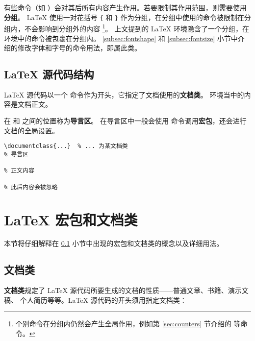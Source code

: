 有些命令（如 ）会对其后所有内容产生作用。若要限制其作用范围，则需要使用\textbf{分组}。
\LaTeX{} 使用一对花括号 \verb|{| 和 \verb|}| 作为分组，在分组中使用的命令被限制在分组内，不会影响到分组外的内容%
\footnote{个别命令在分组内仍然会产生全局作用，例如第 \ref{sec:counters} 节介绍的  等命令。}。
上文提到的 \LaTeX{} 环境隐含了一个分组，在环境中的命令被包裹在分组内。
\ref{subsec:fontshape} 和 \ref{subsec:fontsize} 小节中介绍的修改字体和字号的命令用法，即属此类。

\subsection{\LaTeX{} 源代码结构}\label{subsec:struct}

\LaTeX{} 源代码以一个  命令作为开头，它指定了文档使用的\textbf{文档类}。
 环境当中的内容是文档正文。

在  和  之间的位置称为\textbf{导言区}。
在导言区中一般会使用  命令调用\textbf{宏包}，还会进行文档的全局设置。
\begin{verbatim}
\documentclass{...}  % ... 为某文档类
% 导言区

% 正文内容

% 此后内容会被忽略
\end{verbatim}

\section{\LaTeX{} 宏包和文档类}\label{sec:latex-pkgs}

本节将仔细解释在 \ref{subsec:struct} 小节中出现的宏包和文档类的概念以及详细用法。

\subsection{文档类}\label{subsec:classes}

\textbf{文档类}规定了 \LaTeX{} 源代码所要生成的文档的性质——普通文章、书籍、演示文稿、
个人简历等等。\LaTeX{} 源代码的开头须用指定文档类：
\begin{command}
\end{command}

